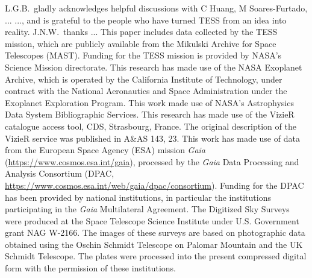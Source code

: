 \documentclass[12pt,twocolumn,tighten]{aastex62}
\begin{document}
\acknowledgements
L.G.B.\ gladly acknowledges helpful discussions with
C Huang, M Soares-Furtado, ...
..., and is
grateful to the people who have turned TESS from an idea into reality.
%
J.N.W.\ thanks ...
%
This paper includes data collected by the TESS mission, which are
publicly available from the Mikulski Archive for Space Telescopes
(MAST).
%
Funding for the TESS mission is provided by NASA's Science Mission
directorate.
%
This research has made use of the NASA Exoplanet Archive, which is
operated by the California Institute of Technology, under contract
with the National Aeronautics and Space Administration under the
Exoplanet Exploration Program.
%
This work made use of NASA's Astrophysics Data System Bibliographic
Services.
%
This research has made use of the VizieR catalogue access tool, CDS,
Strasbourg, France. The original description of the VizieR service was
published in A\&AS 143, 23.
%
This work has made use of data from the European Space Agency (ESA)
mission {\it Gaia} (\url{https://www.cosmos.esa.int/gaia}), processed
by the {\it Gaia} Data Processing and Analysis Consortium (DPAC,
\url{https://www.cosmos.esa.int/web/gaia/dpac/consortium}). Funding
for the DPAC has been provided by national institutions, in particular
the institutions participating in the {\it Gaia} Multilateral
Agreement.
%
The Digitized Sky Surveys were produced at the Space Telescope Science Institute under U.S. Government grant NAG W-2166. The images of these surveys are based on photographic data obtained using the Oschin Schmidt Telescope on Palomar Mountain and the UK Schmidt Telescope. The plates were processed into the present compressed digital form with the permission of these institutions.
%
\newline
%
%
\end{document}
